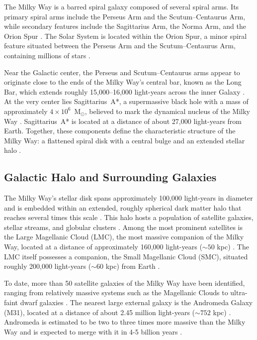 

The Milky Way is a barred spiral galaxy composed of several spiral arms. Its primary spiral arms include the Perseus Arm and the Scutum--Centaurus Arm, while secondary features include the Sagittarius Arm, the Norma Arm, and the Orion Spur \citep{Reid2014, Vallée2017}. The Solar System is located within the Orion Spur, a minor spiral feature situated between the Perseus Arm and the Scutum--Centaurus Arm, containing millions of stars \citep{Reid2019}.

Near the Galactic center, the Perseus and Scutum--Centaurus arms appear to originate close to the ends of the Milky Way’s central bar, known as the Long Bar, which extends roughly 15,000--16,000 light-years across the inner Galaxy \citep{Benjamin2005, Wegg2015}. At the very center lies Sagittarius~A*, a supermassive black hole with a mass of approximately $4 \times 10^6$~M$_\odot$, believed to mark the dynamical nucleus of the Milky Way \citep{Ghez2008, Gillessen2009}. Sagittarius~A* is located at a distance of about 27,000 light-years from Earth. Together, these components define the characteristic structure of the Milky Way: a flattened spiral disk with a central bulge and an extended stellar halo \citep{Bland-Hawthorn-2016}.



\subsection{Galactic Halo and Surrounding Galaxies}

The Milky Way’s stellar disk spans approximately 100,000 light-years in diameter and is embedded within an extended, roughly spherical dark matter halo that reaches several times this scale \citep{Bland-Hawthorn2016, Sofue2013}. This halo hosts a population of satellite galaxies, stellar streams, and globular clusters \citep{McConnachie2012, Helmi2020}. Among the most prominent satellites is the Large Magellanic Cloud (LMC), the most massive companion of the Milky Way, located at a distance of approximately 160,000 light-years ($\sim 50$ kpc) \citep{Pietrzynski2013, Kallivayalil2013}. The LMC itself possesses a companion, the Small Magellanic Cloud (SMC), situated roughly 200,000 light-years ($\sim 60$ kpc) from Earth \citep{Harris2006}.



To date, more than 50 satellite galaxies of the Milky Way have been identified, ranging from relatively massive systems such as the Magellanic Clouds to ultra-faint dwarf galaxies \citep{2019simon}. The nearest large external galaxy is the Andromeda Galaxy (M31), located at a distance of about 2.45 million light-years ($\sim 752$ kpc) \citep{2012riess}. Andromeda is estimated to be two to three times more massive than the Milky Way \citep{2012tamm} and is expected to merge with it in 4-5 billion years \citep{2012vanDerMarel}.

